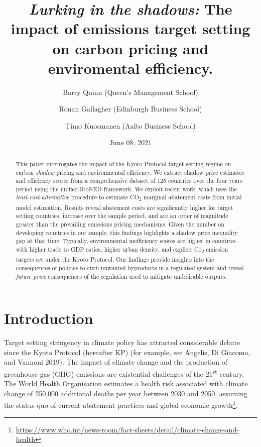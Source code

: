\documentclass[
  10pt,
]{article}
\title{\emph{Lurking in the shadows:} The impact of emissions target setting on
carbon pricing and enviromental efficiency.}
\author{Barry Quinn (Queen's Management School) \and Ronan Gallagher (Edinburgh Business School) \and Timo Kuosmanen (Aalto Business School)}
\date{June 08, 2021}
\begin{document}
\maketitle
\begin{abstract}
This paper interrogates the impact of the Kyoto Protocol target setting
regime on carbon \emph{shadow} pricing and environmental efficiency. We
extract shadow price estimates and efficiency scores from a
comprehensive dataset of 125 countries over the four years period using
the unified StoNED framework. We exploit recent work, which uses the
\emph{least-cost alternative} procedure to estimate CO\textsubscript{2}
marginal abatement costs from initial model estimation. Results reveal
abatement costs are significantly higher for target setting countries,
increase over the sample period, and are an order of magnitude greater
than the prevailing emissions pricing mechanisms. Given the number on
developing countries in our sample, this findings highlights a shadow
price inequality gap at that time. Typically, environmental inefficiency
scores are higher in countries with higher trade to GDP ratios, higher
urban density, and explicit C0\textsubscript{2} emission targets set
under the Kyoto Protocol. Our findings provide insights into the
consequences of policies to curb unwanted byproducts in a regulated
system and reveal \emph{future price} consequences of the regulation
used to mitigate undesirable outputs.
\end{abstract}

\hypertarget{introduction}{%
\section{Introduction}\label{introduction}}

Target setting stringency in climate policy has attracted considerable
debate since the Kyoto Protocol (hereafter KP) (for example, see
Angelis, Di Giacomo, and Vannoni 2019). The impact of climate change and
the production of greenhouse gas (GHG) emissions are existential
challenges of the 21\textsuperscript{st} century. The World Health
Organisation estimates a health risk associated with climate change of
250,000 additional deaths per year between 2030 and 2050, assuming the
status quo of current abatement practices and global economic
growth\footnote{\url{https://www.who.int/news-room/fact-sheets/detail/climate-change-and-health}}.
\end{document}

